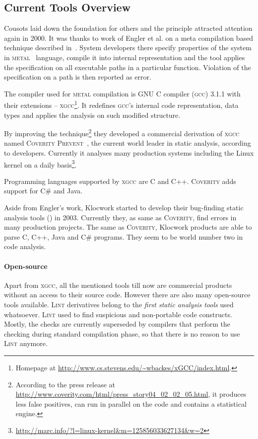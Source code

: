 \documentclass[11pt,a4paper]{article}
\begin{document}
\subsection{Current Tools Overview}
\label{tools}
Cousots laid down the foundation for others and the principle attracted
attention again in 2000. It was thanks to work of Engler et al. on a meta
compilation based technique described in~\cite{metacomp}. System developers
there specify properties of the system in \textsc{metal}~\cite{metal} language,
compile it into internal representation and the tool applies the specification
on all executable paths in a particular function. Violation of the
specification on a path is then reported as error.

The compiler used for \textsc{metal} compilation is GNU C compiler
(\textsc{gcc}) 3.1.1 with their extensions -- \textsc{xgcc}\footnote{Homepage
at \url{http://www.cs.stevens.edu/~wbackes/xGCC/index.html}.}. It redefines
\textsc{gcc}'s internal code representation, data types and applies the
analysis on such modified structure.

By improving the technique\footnote{According to the press release at
\href{http://www.coverity.com/html/press_story04_02_02_05.html}%
{http://www.coverity.com/html/press\_story04\_02\_02\_05.html}, it produces
less false positives, can run in parallel on the code and contains a
statistical engine.} they developed a commercial derivation of \textsc{xgcc}
named \textsc{Coverity Prevent}~\cite{coverity}, the current world leader in
static analysis, according to developers. Currently it analyses many
production systems including the Linux kernel on a daily
basis\footnote{\url{http://marc.info/?l=linux-kernel&m=125856033627134&w=2}}.

Programming languages supported by \textsc{xgcc} are C and C++.
\textsc{Coverity} adds support for C\# and Java.

Aside from Engler's work, Klocwork started to develop their bug-finding static
analysis tools (\cite{klocwork}) in 2003. Currently they, as same as
\textsc{Coverity}, find errors in many production projects. The same as
\textsc{Coverity}, Klocwork products are able to parse C, C++, Java and C\#
programs. They seem to be world number two in code analysis.

\paragraph{Open-source}
Apart from \textsc{xgcc}, all the mentioned tools till now are commercial
products without an access to their source code. However there are also many
open-source tools available. \textsc{Lint} derivatives belong to the
\emph{first static analysis tools} used whatsoever. \textsc{Lint} used to find
suspicious and non-portable code constructs. Mostly, the checks are currently
superseded by compilers that perform the checking during standard compilation
phase, so that there is no reason to use \textsc{Lint} anymore.
\end{document}
